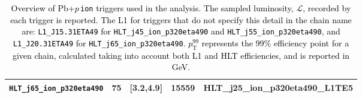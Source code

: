 \documentclass[NOTE, atlasdraft=true, texlive=2020, UKenglish]{atlasdoc}
\newcommand{\PTE}{p_{\text{T}}}
\newcommand{\Pbxp}{Pb+$p$}
\begin{document}
\begin{table}[!ht]
\begin{tabular}{ | c | c | c | c | c |}
            \hline
            \multicolumn{1}{|l|}{\texttt{HLT\_j65\_ion\_p320eta490}}   & 75  & [3.2,4.9]   & 15559 &  \multicolumn{1}{l|}{\tiny HLT\_j25\_ion\_p320eta490\_L1TE5}\\
            \hline
        \end{tabular}
        \vspace{2mm}
        \caption{
        \textcolor{black}{
        Overview of \Pbxp\,\texttt{ion} triggers used in the analysis. The sampled luminosity, $\mathscr{L}$, recorded by each trigger is reported. The L1 for triggers that do not specify this detail in the chain name are:  \texttt{L1\_J15.31ETA49} for \texttt{HLT\_j45\_ion\_p320eta490} and \texttt{HLT\_j55\_ion\_p320eta490}, and \texttt{L1\_J20.31ETA49} for \texttt{HLT\_j65\_ion\_p320eta490}. $\PTE^{99}$ represents the 99\% efficiency point for a given chain, calculated taking into account both L1 and HLT efficiencies, and is reported in GeV. 
}
        }
        \label{tab:trigger_overview_Pbp_ion}
\end{table}
\end{document}
